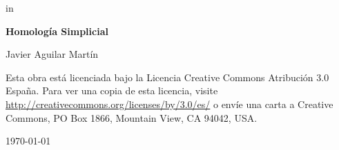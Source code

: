 \documentclass[twoside]{report}
\begin{document}
 in

\thispagestyle{empty}

\begin{titlepage}
	\centering
	{\huge\bfseries Homología Simplicial \par}
	\vspace{2cm}
	{\Large Javier Aguilar Martín\par}
	\vspace{2.5cm}
	\vfill
	Esta obra está licenciada bajo la Licencia Creative Commons Atribución 3.0 España. Para ver una copia de esta licencia, visite \url{http://creativecommons.org/licenses/by/3.0/es/} o envíe una carta a Creative Commons, PO Box 1866, Mountain View, CA 94042, USA.

	{\large \today\par}
\end{titlepage}
	


\begin{center}
\end{center}



\setcounter{page}{0}

\tableofcontents




%
%
%
%
%
%
%
%

\end{document}
